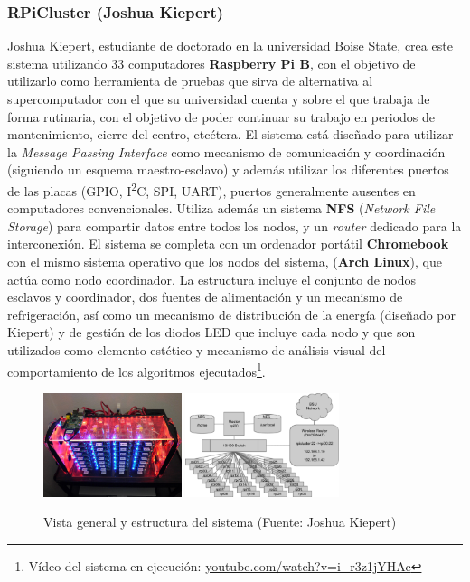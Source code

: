 \subsubsection{RPiCluster (Joshua Kiepert)}

Joshua Kiepert, estudiante de doctorado en la universidad Boise State, crea este sistema utilizando 33 computadores \textbf{Raspberry Pi B}, con el objetivo de utilizarlo como herramienta de pruebas que sirva de alternativa al supercomputador con el que su universidad cuenta\cite{joshuarpicluster} y sobre el que trabaja de forma rutinaria, con el objetivo de poder continuar su trabajo en periodos de mantenimiento, cierre del centro, etcétera. El sistema está diseñado para utilizar la \textit{Message Passing Interface} como mecanismo de comunicación y coordinación (siguiendo un esquema maestro-esclavo) y además utilizar los diferentes puertos de las placas (GPIO, I\textsuperscript{2}C, SPI, UART), puertos generalmente ausentes en computadores convencionales. Utiliza además un sistema \textbf{NFS} (\textit{Network File Storage}) para compartir datos entre todos los nodos, y un \textit{router} dedicado para la interconexión. El sistema se completa con un ordenador portátil \textbf{Chromebook} con el mismo sistema operativo que los nodos del sistema, (\textbf{Arch Linux}), que actúa como nodo coordinador. La estructura incluye el conjunto de nodos esclavos y coordinador, dos fuentes de alimentación y un mecanismo de refrigeración, así como un mecanismo de distribución de la energía (diseñado por Kiepert) y de gestión de los diodos LED que incluye cada nodo y que son utilizados como elemento estético y mecanismo de análisis visual del comportamiento de los algoritmos ejecutados\footnote{Vídeo del sistema en ejecución: \href{https://www.youtube.com/watch?v=i_r3z1jYHAc}{youtube.com/watch?v=i\_r3z1jYHAc}}.


\begin{figure}[H]
  \centering
  \includegraphics[width=0.36\textwidth]{Chapter4/Figures/kiepert-main}
  \includegraphics[width=0.4\textwidth]{Chapter4/Figures/kiepert.png}
  \caption[RPiCluster]{Vista general y estructura del sistema (Fuente: Joshua Kiepert)}
  \label{kiepert:structure}
\end{figure}

